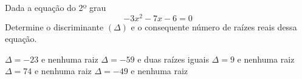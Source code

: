 Dada a equação do 2º grau
\[-3x^2-7x-6=0\]
Determine o discriminante $(\Delta)$ e o consequente número de raízes reais dessa equação.

$\Delta=-23$ e nenhuma raiz
$\Delta=-59$ e duas raízes iguais
$\Delta=9$ e nenhuma raiz
$\Delta=74$ e nenhuma raiz
$\Delta=-49$ e nenhuma raiz



